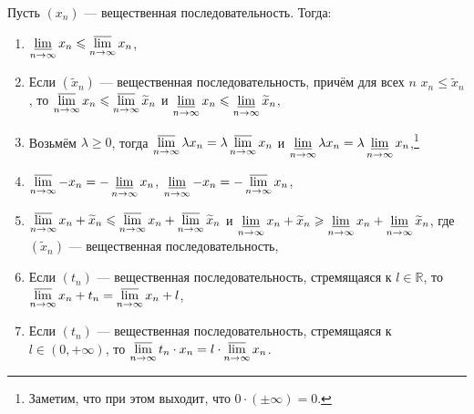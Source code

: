 \begin{theorem}
	Пусть \((x_n)\) --- вещественная последовательность. Тогда:
	\begin{enumerate}
		\item \(\varliminf\limits_{n \to \infty} x_n \leqslant \varlimsup\limits_{n \to \infty} x_n\),
		\item Если \((\widetilde{x}_n)\) --- вещественная последовательность, причём для всех \(n\) \(x_n \leqslant \widetilde{x}_n\), то \(\varlimsup\limits_{n \to \infty} x_n \leqslant \varlimsup\limits_{n \to \infty} \widetilde{x}_n\) и \(\varliminf\limits_{n \to \infty} x_n \leqslant \varliminf\limits_{n \to \infty} \widetilde{x}_n\),
		\item Возьмём \(\lambda \geqslant 0\), тогда \(\varlimsup\limits_{n \to \infty} \lambda x_n = \lambda \varlimsup\limits_{n \to \infty} x_n\) и \(\varliminf\limits_{n \to \infty} \lambda x_n = \lambda \varliminf\limits_{n \to \infty} x_n\),\footnote{Заметим, что при этом выходит, что \(0 \cdot (\pm \infty) = 0\).}
		\item \(\varlimsup\limits_{n \to \infty} -x_n = -\varliminf\limits_{n \to \infty} x_n\), \(\varliminf\limits_{n \to \infty} -x_n = -\varlimsup\limits_{n \to \infty} x_n\),
		\item \(\varlimsup\limits_{n \to \infty} x_n + \widetilde{x}_n \leqslant \varlimsup\limits_{n \to \infty} x_n + \varlimsup\limits_{n \to \infty} \widetilde{x}_n\) и \(\varliminf\limits_{n \to \infty} x_n + \widetilde{x}_n \geqslant \varliminf\limits_{n \to \infty} x_n + \varliminf\limits_{n \to \infty} \widetilde{x}_n\), где \((\widetilde{x}_n)\) --- вещественная последовательность,
		\item Если \((t_n)\) --- вещественная последовательность, стремящаяся к \(l \in \mathbb{R}\), то \(\varlimsup\limits_{n \to \infty} x_n + t_n = \varlimsup\limits_{n \to \infty} x_n + l\),
		\item Если \((t_n)\) --- вещественная последовательность, стремящаяся к \(l \in (0, +\infty)\), то \(\varlimsup\limits_{n \to \infty} t_n \cdot x_n = l \cdot \varlimsup\limits_{n \to \infty} x_n\).
	\end{enumerate}
\end{theorem}

